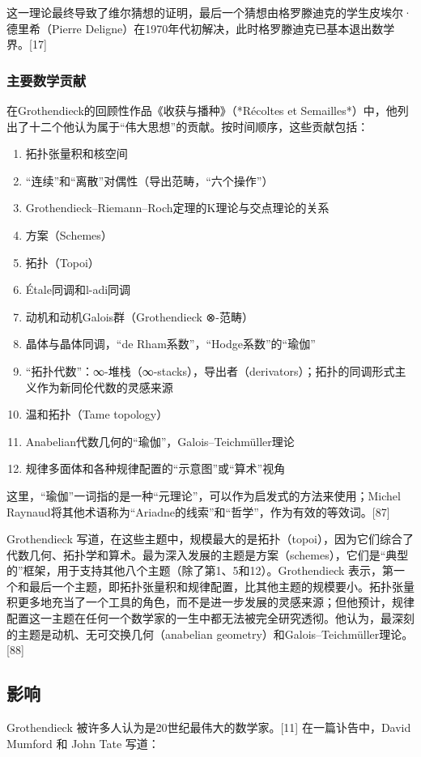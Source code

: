这一理论最终导致了维尔猜想的证明，最后一个猜想由格罗滕迪克的学生皮埃尔·德里希（Pierre Deligne）在1970年代初解决，此时格罗滕迪克已基本退出数学界。[17]
\subsubsection{主要数学贡献}
在Grothendieck的回顾性作品《收获与播种》（*Récoltes et Semailles*）中，他列出了十二个他认为属于“伟大思想”的贡献。按时间顺序，这些贡献包括：
\begin{enumerate}
\item 拓扑张量积和核空间
\item “连续”和“离散”对偶性（导出范畴，“六个操作”）
\item Grothendieck–Riemann–Roch定理的K理论与交点理论的关系
\item 方案（Schemes）
\item 拓扑（Topoi）
\item Étale同调和l-adi同调
\item 动机和动机Galois群（Grothendieck ⊗-范畴）
\item 晶体与晶体同调，“de Rham系数”，“Hodge系数”的“瑜伽”
\item “拓扑代数”：∞-堆栈（∞-stacks），导出者（derivators）；拓扑的同调形式主义作为新同伦代数的灵感来源
\item 温和拓扑（Tame topology）
\item Anabelian代数几何的“瑜伽”，Galois–Teichmüller理论
\item 规律多面体和各种规律配置的“示意图”或“算术”视角
\end{enumerate}
这里，“瑜伽”一词指的是一种“元理论”，可以作为启发式的方法来使用；Michel Raynaud将其他术语称为“Ariadne的线索”和“哲学”，作为有效的等效词。[87]

Grothendieck 写道，在这些主题中，规模最大的是拓扑（topoi），因为它们综合了代数几何、拓扑学和算术。最为深入发展的主题是方案（schemes），它们是“典型的”框架，用于支持其他八个主题（除了第1、5和12）。Grothendieck 表示，第一个和最后一个主题，即拓扑张量积和规律配置，比其他主题的规模要小。拓扑张量积更多地充当了一个工具的角色，而不是进一步发展的灵感来源；但他预计，规律配置这一主题在任何一个数学家的一生中都无法被完全研究透彻。他认为，最深刻的主题是动机、无可交换几何（anabelian geometry）和Galois–Teichmüller理论。[88]
\subsection{影响}  
Grothendieck 被许多人认为是20世纪最伟大的数学家。[11] 在一篇讣告中，David Mumford 和 John Tate 写道：

